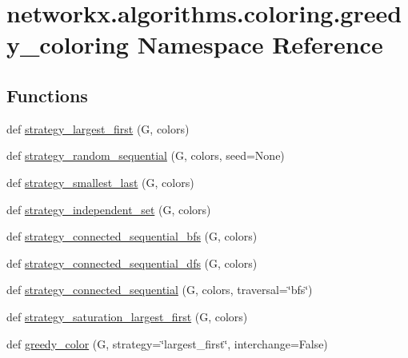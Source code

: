 \hypertarget{namespacenetworkx_1_1algorithms_1_1coloring_1_1greedy__coloring}{}\section{networkx.\+algorithms.\+coloring.\+greedy\+\_\+coloring Namespace Reference}
\label{namespacenetworkx_1_1algorithms_1_1coloring_1_1greedy__coloring}
\subsection*{Functions}
\begin{DoxyCompactItemize}
\item 
def \hyperlink{namespacenetworkx_1_1algorithms_1_1coloring_1_1greedy__coloring_a5b0bba67e48a8670a415e8391c1c7525}{strategy\+\_\+largest\+\_\+first} (G, colors)
\item 
def \hyperlink{namespacenetworkx_1_1algorithms_1_1coloring_1_1greedy__coloring_a9fd080840fb234083cbbf22d40481e23}{strategy\+\_\+random\+\_\+sequential} (G, colors, seed=None)
\item 
def \hyperlink{namespacenetworkx_1_1algorithms_1_1coloring_1_1greedy__coloring_aa8aa245f56f5e4c903b9053479f02b31}{strategy\+\_\+smallest\+\_\+last} (G, colors)
\item 
def \hyperlink{namespacenetworkx_1_1algorithms_1_1coloring_1_1greedy__coloring_a52934c3efed3eab63ae7650945303a2f}{strategy\+\_\+independent\+\_\+set} (G, colors)
\item 
def \hyperlink{namespacenetworkx_1_1algorithms_1_1coloring_1_1greedy__coloring_a2eba150f38b4f43918b422f356d8afde}{strategy\+\_\+connected\+\_\+sequential\+\_\+bfs} (G, colors)
\item 
def \hyperlink{namespacenetworkx_1_1algorithms_1_1coloring_1_1greedy__coloring_a083f2c34bf925c991005f37b6b68630a}{strategy\+\_\+connected\+\_\+sequential\+\_\+dfs} (G, colors)
\item 
def \hyperlink{namespacenetworkx_1_1algorithms_1_1coloring_1_1greedy__coloring_af6e360e9bef4112a7f6f23bdd4af0a6d}{strategy\+\_\+connected\+\_\+sequential} (G, colors, traversal=\char`\"{}bfs\char`\"{})
\item 
def \hyperlink{namespacenetworkx_1_1algorithms_1_1coloring_1_1greedy__coloring_aaddf336ba59c8e00684795b4649b769b}{strategy\+\_\+saturation\+\_\+largest\+\_\+first} (G, colors)
\item 
def \hyperlink{namespacenetworkx_1_1algorithms_1_1coloring_1_1greedy__coloring_aa77dd5672fb54a952ace2eae70899eb1}{greedy\+\_\+color} (G, strategy=\char`\"{}largest\+\_\+first\char`\"{}, interchange=False)
\end{DoxyCompactItemize}
